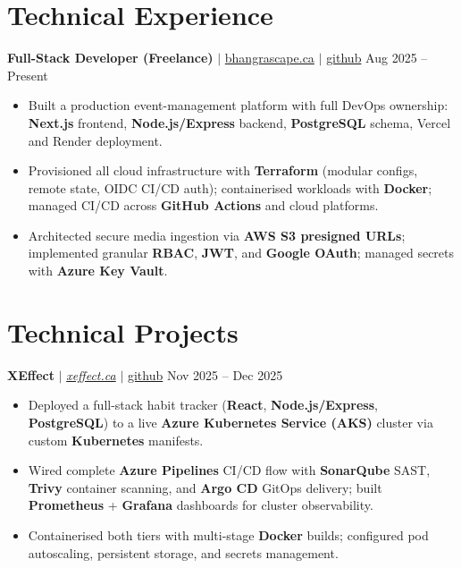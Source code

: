 \documentclass[11pt,a4paper]{article}
\begin{document}
\section{Technical Experience}

\textbf{Full-Stack Developer (Freelance)} $|$ \href{https://bhangrascape.ca}{bhangrascape.ca} $|$ \href{https://github.com/bhat0155/bhangraescape}{\small github} \hfill Aug 2025 -- Present
\begin{itemize}
    \item Built a production event-management platform with full DevOps ownership: \textbf{Next.js} frontend, \textbf{Node.js/Express} backend, \textbf{PostgreSQL} schema, Vercel and Render deployment.
    \item Provisioned all cloud infrastructure with \textbf{Terraform} (modular configs, remote state, OIDC CI/CD auth); containerised workloads with \textbf{Docker}; managed CI/CD across \textbf{GitHub Actions} and cloud platforms.
    \item Architected secure media ingestion via \textbf{AWS S3 presigned URLs}; implemented granular \textbf{RBAC}, \textbf{JWT}, and \textbf{Google OAuth}; managed secrets with \textbf{Azure Key Vault}.
\end{itemize}

\section{Technical Projects}

\textbf{XEffect} $|$ \href{https://www.xeffect.ca/app}{\emph{xeffect.ca}} $|$ \href{https://github.com/bhat0155/xeffect}{\small github} \hfill Nov 2025 -- Dec 2025
\begin{itemize}
    \item Deployed a full-stack habit tracker (\textbf{React}, \textbf{Node.js/Express}, \textbf{PostgreSQL}) to a live \textbf{Azure Kubernetes Service (AKS)} cluster via custom \textbf{Kubernetes} manifests.
    \item Wired complete \textbf{Azure Pipelines} CI/CD flow with \textbf{SonarQube} SAST, \textbf{Trivy} container scanning, and \textbf{Argo CD} GitOps delivery; built \textbf{Prometheus} + \textbf{Grafana} dashboards for cluster observability.
    \item Containerised both tiers with multi-stage \textbf{Docker} builds; configured pod autoscaling, persistent storage, and secrets management.
\end{itemize}
\end{document}
